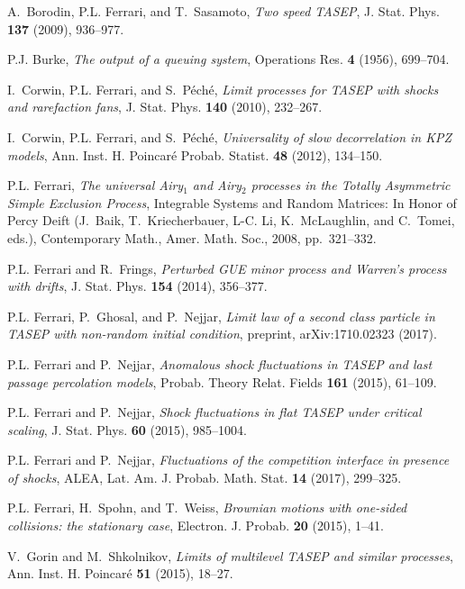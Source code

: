 \documentclass[12pt,a4paper]{article}
\numberwithin{equation}{section}
\begin{document}
\begin{thebibliography}{10}
A.~Borodin, P.L. Ferrari, and T.~Sasamoto, \emph{{Two speed TASEP}}, J. Stat.
  Phys. \textbf{137} (2009), 936--977.

P.J. Burke, \emph{The output of a queuing system}, Operations Res. \textbf{4}
  (1956), 699--704.

I.~Corwin, P.L. Ferrari, and S.~P{\'e}ch{\'e}, \emph{{Limit processes for TASEP
  with shocks and rarefaction fans}}, J. Stat. Phys. \textbf{140} (2010),
  232--267.

I.~Corwin, P.L. Ferrari, and S.~P{\'e}ch{\'e}, \emph{{Universality of slow
  decorrelation in KPZ models}}, Ann. Inst. H. Poincar\'e Probab. Statist.
  \textbf{48} (2012), 134--150.

P.L. Ferrari, \emph{{The universal Airy$_1$ and Airy$_2$ processes in the
  Totally Asymmetric Simple Exclusion Process}}, Integrable Systems and Random
  Matrices: In Honor of Percy Deift (J.~Baik, T.~Kriecherbauer, L-C. Li,
  K.~McLaughlin, and C.~Tomei, eds.), Contemporary Math., Amer. Math. Soc.,
  2008, pp.~321--332.

P.L. Ferrari and R.~Frings, \emph{{Perturbed GUE minor process and Warren's
  process with drifts}}, J. Stat. Phys. \textbf{154} (2014), 356--377.

P.L. Ferrari, P.~Ghosal, and P.~Nejjar, \emph{{Limit law of a second class
  particle in TASEP with non-random initial condition}}, preprint,
  arXiv:1710.02323 (2017).

P.L. Ferrari and P.~Nejjar, \emph{{Anomalous shock fluctuations in TASEP and
  last passage percolation models}}, Probab. Theory Relat. Fields \textbf{161}
  (2015), 61--109.

P.L. Ferrari and P.~Nejjar, \emph{{Shock fluctuations in flat TASEP under
  critical scaling}}, J. Stat. Phys. \textbf{60} (2015), 985--1004.

P.L. Ferrari and P.~Nejjar, \emph{{Fluctuations of the competition interface in
  presence of shocks}}, ALEA, Lat. Am. J. Probab. Math. Stat. \textbf{14}
  (2017), 299--325.

P.L. Ferrari, H.~Spohn, and T.~Weiss, \emph{{Brownian motions with one-sided
  collisions: the stationary case}}, Electron. J. Probab. \textbf{20} (2015),
  1--41.

V.~Gorin and M.~Shkolnikov, \emph{{Limits of multilevel TASEP and similar
  processes}}, Ann. Inst. H. Poincar\'e \textbf{51} (2015), 18--27.


\end{thebibliography}
\end{document}
